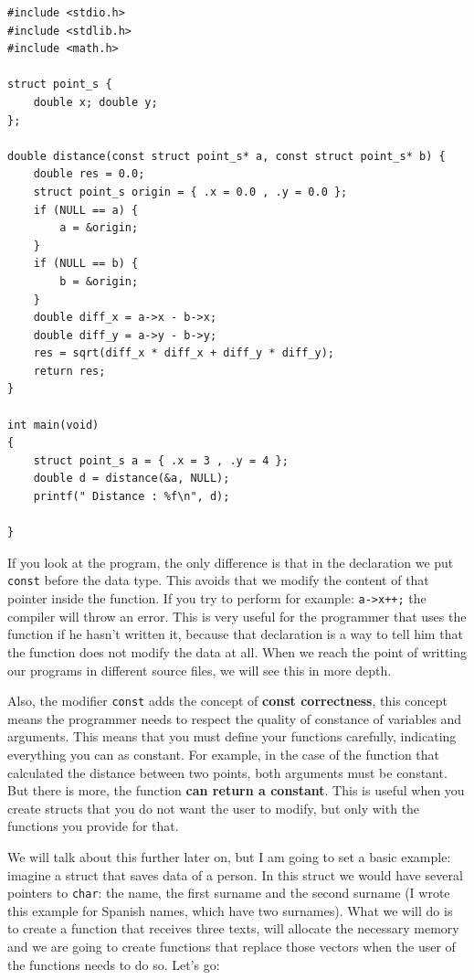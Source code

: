 \documentclass[a4paper]{article}
\begin{document}
\noindent
\begin{minipage}[H]{\linewidth}
\mbox{}
\begin{lstlisting}[style=C,
caption={Uso de punteros constantes como argumentos de función},
label={lst:constantArguments}]
#include <stdio.h>
#include <stdlib.h>
#include <math.h>

struct point_s {
    double x; double y;
};

double distance(const struct point_s* a, const struct point_s* b) {
    double res = 0.0;
    struct point_s origin = { .x = 0.0 , .y = 0.0 };
    if (NULL == a) {
        a = &origin;
    }
    if (NULL == b) {
        b = &origin;
    }
    double diff_x = a->x - b->x;
    double diff_y = a->y - b->y;
    res = sqrt(diff_x * diff_x + diff_y * diff_y);
    return res;
}

int main(void)
{
    struct point_s a = { .x = 3 , .y = 4 };
    double d = distance(&a, NULL);
    printf(" Distance : %f\n", d);

}
\end{lstlisting}
\end{minipage}

If you look at the program, the only difference is that in the declaration we
put \verb!const! before the data type. This avoids that we modify the content
of that pointer inside the function. If you try to perform for example:
\verb!a->x++;! the compiler will throw an error. This is very useful for the
programmer that uses the function if he hasn't written it, because that
declaration is a way to tell him that the function does not modify the data at
all. When we reach the point of writting our programs in different source files,
we will see this in more depth.

Also, the modifier \verb!const! adds the concept of \textbf{const correctness},
this concept means the programmer needs to respect the quality of constance of
variables and arguments. This means that you must define your functions
carefully, indicating everything you can as constant. For example, in the
case of the function that calculated the distance between two points, both
arguments must be constant. But there is more, the function \textbf{can return a
constant}. This is useful when you create structs that you do not want the user
to modify, but only with the functions you provide for that.

We will talk about this further later on, but I am going to set a basic example:
imagine a struct that saves data of a person. In this struct we would have
several pointers to \verb!char!: the name, the first surname and the second
surname (I wrote this example for Spanish names, which have two surnames). What
we will do is to create a function that receives three texts, will allocate the
necessary memory and we are going to create functions that replace those vectors
when the user of the functions needs to do so. Let's go:
\end{document}
